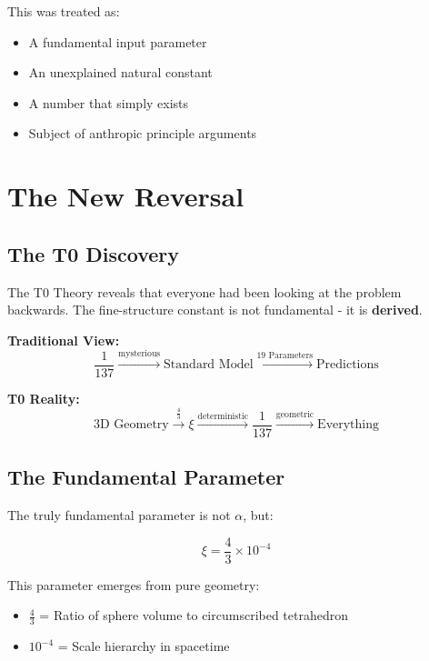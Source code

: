 \documentclass[12pt,a4paper]{article}
\theoremstyle{definition}
\begin{document}
	This was treated as:
	\begin{itemize}
		\item A fundamental input parameter
		\item An unexplained natural constant
		\item A number that simply exists
		\item Subject of anthropic principle arguments
	\end{itemize}
	
	\section{The New Reversal}
	
	\subsection{The T0 Discovery}
	
	The T0 Theory reveals that everyone had been looking at the problem backwards. The fine-structure constant is not fundamental - it is \textbf{derived}.
	
	\begin{newperspective}
		\textbf{Traditional View:}
		\begin{equation}
			\frac{1}{137} \xrightarrow{\text{mysterious}} \text{Standard Model} \xrightarrow{\text{19 Parameters}} \text{Predictions}
		\end{equation}
		
		\textbf{T0 Reality:}
		\begin{equation}
			\text{3D Geometry} \xrightarrow{\frac{4}{3}} \xi \xrightarrow{\text{deterministic}} \frac{1}{137} \xrightarrow{\text{geometric}} \text{Everything}
		\end{equation}
	\end{newperspective}
	
	\subsection{The Fundamental Parameter}
	
	The truly fundamental parameter is not $\alpha$, but:
	
	\begin{equation}
		\boxed{\xi = \frac{4}{3} \times 10^{-4}}
	\end{equation}
	
	This parameter emerges from pure geometry:
	\begin{itemize}
		\item $\frac{4}{3}$ = Ratio of sphere volume to circumscribed tetrahedron
		\item $10^{-4}$ = Scale hierarchy in spacetime
	\end{itemize}
	
\end{document}
